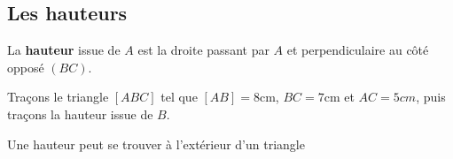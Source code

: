 \documentclass[a4paper,10pt]{report}
\begin{document}
\subsection{Les hauteurs}

\begin{defn} 
   La \textbf{hauteur} issue de $A$ est la droite passant par $A$ et perpendiculaire au côté opposé $(BC)$.
\end{defn}
\medskip

\begin{ex}
Traçons le triangle $[ABC]$ tel que $[AB]=8$cm, $BC=7$cm et $AC=5cm$, puis traçons la hauteur issue de $B$.

\noindent\grandscarreaux{\linewidth}{7cm}
\end{ex}

\begin{rem}
Une hauteur peut se trouver à l'extérieur d'un triangle
\end{rem}
\end{document}
